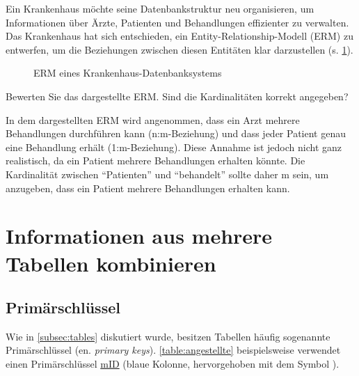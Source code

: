 \begin{myexercise}
  Ein Krankenhaus möchte seine Datenbankstruktur neu organisieren, um Informationen über Ärzte, Patienten und Behandlungen effizienter zu verwalten. Das Krankenhaus hat sich entschieden, ein Entity-Relationship-Modell (ERM) zu entwerfen, um die Beziehungen zwischen diesen Entitäten klar darzustellen (s. \cref{fig:erm-hospital}).
  \begin{figure}[H]
    \centering
    \caption{ERM eines Krankenhaus-Datenbanksystems}
    \label{fig:erm-hospital}
  \end{figure}
  Bewerten Sie das dargestellte ERM. Sind die Kardinalitäten korrekt angegeben?
  \begin{myanswer}
    In dem dargestellten ERM wird angenommen, dass ein Arzt mehrere Behandlungen durchführen kann (n:m-Beziehung) und dass jeder Patient genau eine Behandlung erhält (1:m-Beziehung). Diese Annahme ist jedoch nicht ganz realistisch, da ein Patient mehrere Behandlungen erhalten könnte. Die Kardinalität zwischen ``Patienten'' und ``behandelt'' sollte daher m sein, um anzugeben, dass ein Patient mehrere Behandlungen erhalten kann.
  \end{myanswer}
\end{myexercise}


\clearpage


\section{Informationen aus mehrere Tabellen kombinieren}
\subsection{Primärschlüssel}
Wie in \cref{subsec:tables} diskutiert wurde, besitzen Tabellen häufig sogenannte Primärschlüssel (en. \textit{primary keys}). \cref{table:angestellte} beispielsweise verwendet einen Primärschlüssel \underline{mID} (blaue Kolonne, hervorgehoben mit dem Symbol ). 

